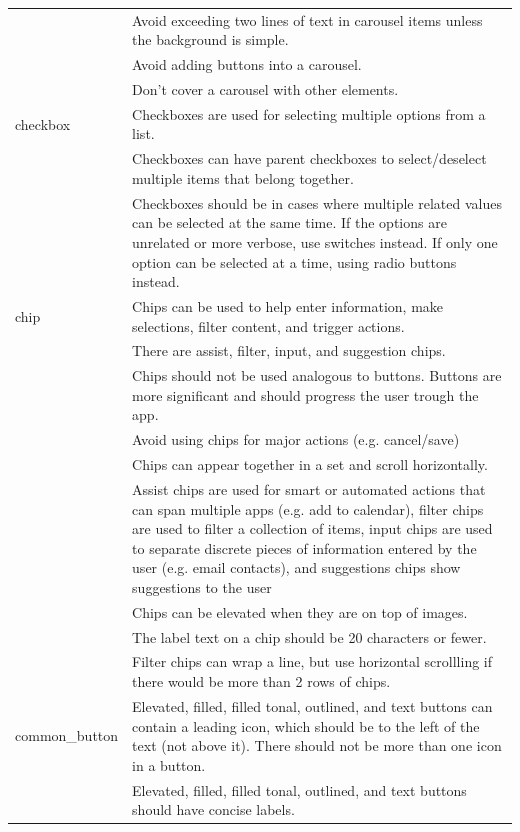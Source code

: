 \documentclass[11pt,titlepage,oneside,openany]{book}
\begin{document}
\begin{longtable}{|p{}|p{}|}
	~ & Avoid exceeding two lines of text in carousel items unless the background is simple. \\ 
	~ & Avoid adding buttons into a carousel. \\ 
	~ & Don't cover a carousel with other elements. \\ \hline
	checkbox & Checkboxes are used for selecting multiple options from a list. \\ 
	~ & Checkboxes can have parent checkboxes to select/deselect multiple items that belong together. \\ 
	~ & Checkboxes should be in cases where multiple related values can be selected at the same time. If the options are unrelated or more verbose, use switches instead. If only one option can be selected at a time, using radio buttons instead. \\ \hline
	chip & Chips can be used to help enter information, make selections, filter content, and trigger actions. \\ 
	~ & There are assist, filter, input, and suggestion chips. \\ 
	~ & Chips should not be used analogous to buttons. Buttons are more significant and should progress the user trough the app. \\ 
	~ & Avoid using chips for major actions (e.g. cancel/save) \\ 
	~ & Chips can appear together in a set and scroll horizontally. \\ 
	~ & Assist chips are used for smart or automated actions that can span multiple apps (e.g. add to calendar), filter chips are used to filter a collection of items, input chips are used to separate discrete pieces of information entered by the user (e.g. email contacts), and suggestions chips show suggestions to the user \\ 
	~ & Chips can be elevated when they are on top of images. \\ 
	~ & The label text on a chip should be 20 characters or fewer. \\ 
	~ & Filter chips can wrap a line, but use horizontal scrollling if there would be more than 2 rows of chips. \\ \hline
	common\_button & Elevated, filled, filled tonal, outlined, and text buttons can contain a leading icon, which should be to the left of the text (not above it). There should not be more than one icon in a button. \\ 
	~ & Elevated, filled, filled tonal, outlined, and text buttons should have concise labels. \\ 

\end{longtable}
\end{document}
